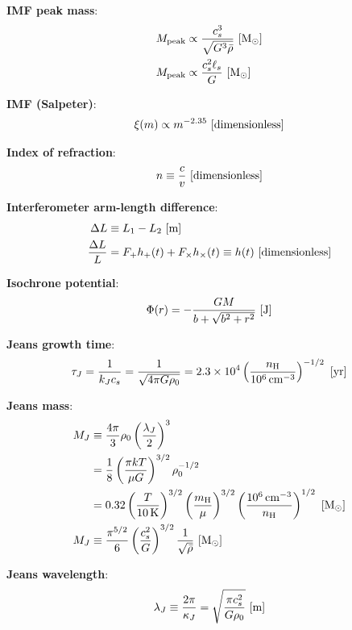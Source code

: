 \documentclass[a4paper,10pt]{article}
\begin{document}
{\noindent}\textbf{IMF peak mass}:
\begin{align*}
    M_\mathrm{peak} &\propto \frac{c_s^3}{\sqrt{G^3\bar{\rho}}}  ~ [{\rm M_\odot}] \\
    M_\mathrm{peak} &\propto \frac{c_s^2\ell_s}{G} ~ [{\rm M_\odot}]
\end{align*}

{\noindent}\textbf{IMF (Salpeter)}:
\begin{align*}
    \xi(m) \propto m^{-2.35} ~ [{\rm dimensionless}]
\end{align*}

{\noindent}\textbf{Index of refraction}:
\begin{align*}
    n \equiv \frac{c}{v} ~ [{\rm dimensionless}]
\end{align*}

{\noindent}\textbf{Interferometer arm-length difference}:
\begin{align*}
    \Delta L &\equiv L_1 - L_2 ~ [{\rm m}] \\
    \frac{\Delta L}{L} &= F_+h_+(t) + F_\times h_\times(t) \equiv h(t) ~ [{\rm dimensionless}]
\end{align*}

{\noindent}\textbf{Isochrone potential}:
\begin{align*}
    \Phi(r) = - \frac{GM}{b + \sqrt{b^2+r^2}} ~ [{\rm J}]
\end{align*}

{\noindent}\textbf{Jeans growth time}:
\begin{align*}
    \tau_J = \frac{1}{k_Jc_s} = \frac{1}{\sqrt{4\pi G\rho_0}} = 2.3\times10^4 \left(\frac{n_{\rm H}}{10^6\,{\rm cm^{-3}}}\right)^{-1/2} ~ [{\rm yr}]
\end{align*}

{\noindent}\textbf{Jeans mass}:
\begin{align*}
    M_J &\equiv \frac{4\pi}{3}\rho_0 \left(\frac{\lambda_J}{2}\right)^3 \\
        &= \frac{1}{8} \left(\frac{\pi kT}{\mu G}\right)^{3/2} \rho_0^{-1/2} \\
        &= 0.32 \left(\frac{T}{10\,{\rm K}}\right)^{3/2} \left(\frac{m_{\rm H}}{\mu}\right)^{3/2} \left(\frac{10^6\,{\rm cm^{-3}}}{n_{\rm H}}\right)^{1/2} ~ [{\rm M_\odot}] \\
    M_J &\equiv \frac{\pi^{5/2}}{6}\left(\frac{c_s^2}{G}\right)^{3/2}\frac{1}{\sqrt{\bar{\rho}}} ~ [{\rm M_\odot}]
\end{align*}

{\noindent}\textbf{Jeans wavelength}:
\begin{align*}
    \lambda_J \equiv \frac{2\pi}{\kappa_J} = \sqrt{\frac{\pi c_s^2}{G\rho_0}} ~ [{\rm m}]
\end{align*}
\end{document}
